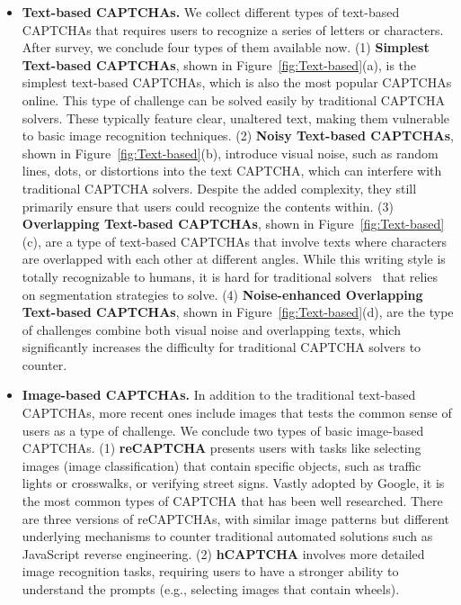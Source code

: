 \begin{itemize}[leftmargin=*]
    \item \textbf{Text-based CAPTCHAs.} We collect different types of text-based CAPTCHAs that requires users to recognize a series of letters or characters. After survey, we conclude four types of them available now. (1) \textbf{Simplest Text-based CAPTCHAs}, shown in Figure~\ref{fig:Text-based}(a), is the simplest text-based CAPTCHAs, which is also the most popular CAPTCHAs online. This type of challenge can be solved easily by traditional CAPTCHA solvers. These typically feature clear, unaltered text, making them vulnerable to basic image recognition techniques. 
    (2) \textbf{Noisy Text-based CAPTCHAs}, shown in Figure~\ref{fig:Text-based}(b), introduce visual noise, such as random lines, dots, or distortions into the text CAPTCHA, which can interfere with traditional CAPTCHA solvers. Despite the added complexity, they still primarily ensure that users could recognize the contents within.
    (3) \textbf{Overlapping Text-based CAPTCHAs}, shown in Figure~\ref{fig:Text-based}(c), are a type of text-based CAPTCHAs that involve texts where characters are overlapped with each other at different angles. While this writing style is totally recognizable to humans, it is hard for traditional solvers~\cite{ye2018yet} that relies on segmentation strategies to solve. 
    (4) \textbf{Noise-enhanced Overlapping Text-based CAPTCHAs}, shown in Figure~\ref{fig:Text-based}(d), are the type of challenges combine both visual noise and overlapping texts, which significantly increases the difficulty for traditional CAPTCHA solvers to counter. 

    \item \textbf{Image-based CAPTCHAs.} In addition to the traditional text-based CAPTCHAs, more recent ones include images that tests the common sense of users as a type of challenge. We conclude two types of basic image-based CAPTCHAs.
    (1) \textbf{reCAPTCHA} presents users with tasks like selecting images (image classification) that contain specific objects, such as traffic lights or crosswalks, or verifying street signs. Vastly adopted by Google, it is the most common types of CAPTCHA that has been well researched. There are three versions of reCAPTCHAs, with similar image patterns but different underlying mechanisms to counter traditional automated solutions such as JavaScript reverse engineering. 
    (2) \textbf{hCAPTCHA} involves more detailed image recognition tasks, requiring users to have a stronger ability to understand the prompts (e.g., selecting images that contain wheels).
    

\end{itemize}
